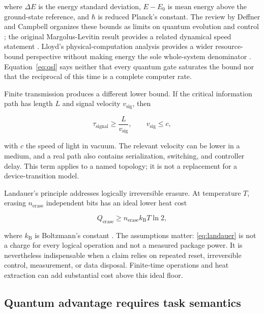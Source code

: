 \documentclass[conference]{IEEEtran}
\begin{document}
where \(\Delta E\) is the energy standard deviation, \(E-E_0\) is mean energy
above the ground-state reference, and \(\hbar\) is reduced Planck's constant.
The review by Deffner and Campbell organizes these bounds as limits on
quantum evolution and control \cite{deffner}; the original
Margolus-Levitin result provides a related dynamical speed statement
\cite{margolus}. Lloyd's physical-computation analysis provides a wider
resource-bound perspective without making energy the sole whole-system
denominator \cite{lloyd}. Equation~\eqref{eq:qsl} says neither that every quantum gate
saturates the bound nor that the reciprocal of this time is a complete
computer rate.

Finite transmission produces a different lower bound. If the critical
information path has length \(L\) and signal velocity
\(v_{\mathrm{sig}}\), then

\begin{equation}
\tau_{\mathrm{signal}} \geq \frac{L}{v_{\mathrm{sig}}},
\qquad v_{\mathrm{sig}}\leq c,
\label{eq:signal}
\end{equation}

with \(c\) the speed of light in vacuum. The relevant velocity can be lower
in a medium, and a real path also contains serialization, switching, and
controller delay. This term applies to a named topology; it is not a
replacement for a device-transition model.

Landauer's principle addresses logically irreversible erasure. At temperature
\(T\), erasing \(n_{\mathrm{erase}}\) independent bits has an ideal lower heat
cost

\begin{equation}
Q_{\mathrm{erase}} \geq n_{\mathrm{erase}} k_{\mathrm{B}}T\ln 2,
\label{eq:landauer}
\end{equation}

where \(k_{\mathrm{B}}\) is Boltzmann's constant \cite{landauer}. The
assumptions matter: \eqref{eq:landauer} is not a charge for every logical
operation and not a measured package power. It is nevertheless indispensable
when a claim relies on repeated reset, irreversible control, measurement, or
data disposal. Finite-time operations and heat extraction can add substantial
cost above this ideal floor.

\subsection{Quantum advantage requires task semantics}
\end{document}
